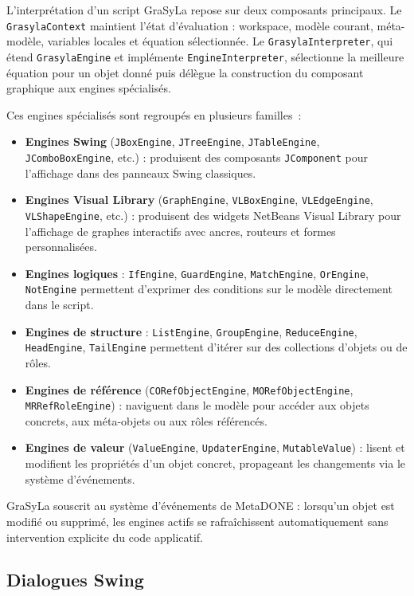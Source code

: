 L'interprétation d'un script GraSyLa repose sur deux composants principaux. Le \texttt{GrasylaContext} maintient l'état d'évaluation : workspace, modèle courant, méta-modèle, variables locales et équation sélectionnée. Le \texttt{GrasylaInterpreter}, qui étend \texttt{GrasylaEngine} et implémente \texttt{EngineInterpreter}, sélectionne la meilleure équation pour un objet donné puis délègue la construction du composant graphique aux engines spécialisés.

Ces engines spécialisés sont regroupés en plusieurs familles~:
\begin{itemize}
    \item \textbf{Engines Swing} (\texttt{JBoxEngine}, \texttt{JTreeEngine}, \texttt{JTableEngine}, \texttt{JComboBoxEngine}, etc.) : produisent des composants \texttt{JComponent} pour l'affichage dans des panneaux Swing classiques.
    \item \textbf{Engines Visual Library} (\texttt{GraphEngine}, \texttt{VLBoxEngine}, \texttt{VLEdgeEngine}, \texttt{VLShapeEngine}, etc.) : produisent des widgets NetBeans Visual Library pour l'affichage de graphes interactifs avec ancres, routeurs et formes personnalisées.
    \item \textbf{Engines logiques} : \texttt{IfEngine}, \texttt{GuardEngine}, \texttt{MatchEngine}, \texttt{OrEngine}, \texttt{NotEngine} permettent d'exprimer des conditions sur le modèle directement dans le script.
    \item \textbf{Engines de structure} : \texttt{ListEngine}, \texttt{GroupEngine}, \texttt{ReduceEngine}, \texttt{HeadEngine}, \texttt{TailEngine} permettent d'itérer sur des collections d'objets ou de rôles.
    \item \textbf{Engines de référence} (\texttt{CORefObjectEngine}, \texttt{MORefObjectEngine}, \texttt{MRRefRoleEngine}) : naviguent dans le modèle pour accéder aux objets concrets, aux méta-objets ou aux
    rôles référencés.
    \item \textbf{Engines de valeur} (\texttt{ValueEngine},
    \texttt{UpdaterEngine}, \texttt{MutableValue}) : lisent et modifient les propriétés d'un objet concret, propageant les changements via le système d'événements.
\end{itemize}

GraSyLa souscrit au système d'événements de MetaDONE : lorsqu'un objet est modifié ou supprimé, les engines actifs se rafraîchissent automatiquement sans intervention explicite du code applicatif.

\subsection{Dialogues Swing}

